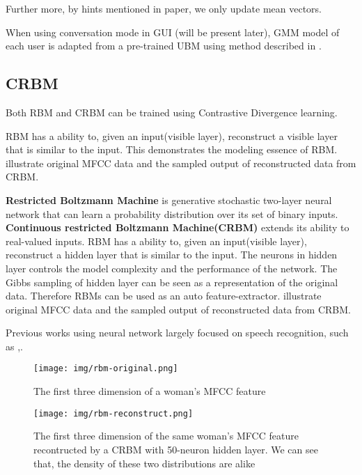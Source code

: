 Further more, by hints mentioned in paper, we only update mean vectors.

When using conversation mode in GUI (will be present later),
GMM model of each user is adapted from a pre-trained UBM
using method described in \cite{reynolds2000speaker}.

\subsection{CRBM}


			Both RBM and CRBM can be trained using Contrastive Divergence learning.

			RBM has a ability to, given an input(visible layer), reconstruct a visible
			layer that is similar to the input. This demonstrates the modeling essence
			of RBM.  illustrate original MFCC data and the sampled output of
			reconstructed data from CRBM.

\textbf{Restricted Boltzmann Machine} is generative stochastic
two-layer neural network that can learn a probability distribution
over its set of binary inputs\cite{rbm_wiki}.  \textbf{Continuous
restricted Boltzmann Machine(CRBM)}\cite{chen2003continuous} extends
its ability to real-valued inputs.  RBM has a ability to, given an
input(visible layer), reconstruct a hidden layer that is similar
to the input.  The neurons
in hidden layer controls the model complexity and the performance of
the network. The Gibbs sampling of hidden layer can be seen as a
representation of the original data. Therefore RBMs can be used
as an auto feature-extractor.
 illustrate original MFCC data and the
sampled output of reconstructed data from CRBM.

Previous works using neural network largely focused on speech
recognition, such as \cite{deep},\cite{mohamed2011deep}.

\begin{figure}[H]
  \begin{minipage}{0.48\linewidth}
    \centering
    \texttt{[image: img/rbm-original.png]}
    \caption*{The first three dimension of a woman's MFCC feature}
  \end{minipage}
  \hfill
  \begin{minipage}{0.48\linewidth}
    \centering
    \texttt{[image: img/rbm-reconstruct.png]}
    \caption*{The first three dimension of the same woman's MFCC feature
      recontructed by a CRBM with 50-neuron hidden layer. We can
      see that, the density of these two distributions are alike}
  \end{minipage}
  \caption{\label{fig:crbm}}
\end{figure}

